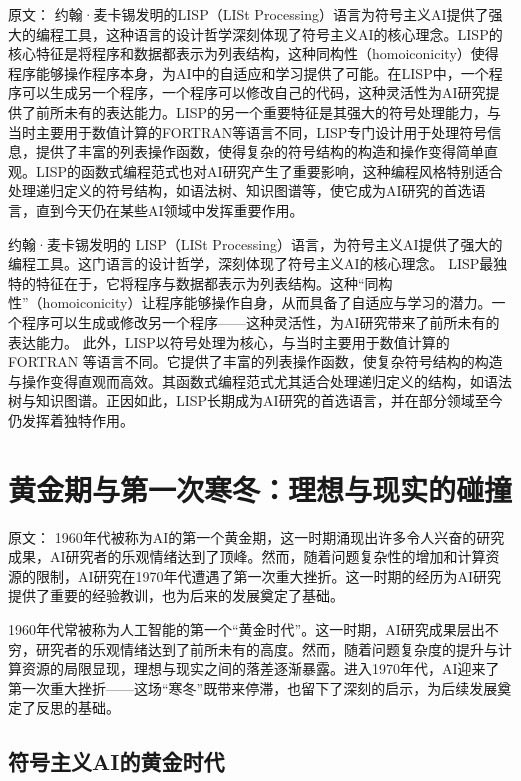 原文：
约翰·麦卡锡发明的LISP（LISt Processing）语言为符号主义AI提供了强大的编程工具，这种语言的设计哲学深刻体现了符号主义AI的核心理念。LISP的核心特征是将程序和数据都表示为列表结构，这种同构性（homoiconicity）使得程序能够操作程序本身，为AI中的自适应和学习提供了可能。在LISP中，一个程序可以生成另一个程序，一个程序可以修改自己的代码，这种灵活性为AI研究提供了前所未有的表达能力。LISP的另一个重要特征是其强大的符号处理能力，与当时主要用于数值计算的FORTRAN等语言不同，LISP专门设计用于处理符号信息，提供了丰富的列表操作函数，使得复杂的符号结构的构造和操作变得简单直观。LISP的函数式编程范式也对AI研究产生了重要影响，这种编程风格特别适合处理递归定义的符号结构，如语法树、知识图谱等，使它成为AI研究的首选语言，直到今天仍在某些AI领域中发挥重要作用。

约翰·麦卡锡发明的 LISP（LISt Processing）语言，为符号主义AI提供了强大的编程工具。这门语言的设计哲学，深刻体现了符号主义AI的核心理念。  
LISP最独特的特征在于，它将程序与数据都表示为列表结构。这种“同构性”（homoiconicity）让程序能够操作自身，从而具备了自适应与学习的潜力。一个程序可以生成或修改另一个程序——这种灵活性，为AI研究带来了前所未有的表达能力。  
此外，LISP以符号处理为核心，与当时主要用于数值计算的 FORTRAN 等语言不同。它提供了丰富的列表操作函数，使复杂符号结构的构造与操作变得直观而高效。其函数式编程范式尤其适合处理递归定义的结构，如语法树与知识图谱。正因如此，LISP长期成为AI研究的首选语言，并在部分领域至今仍发挥着独特作用。

\section{黄金期与第一次寒冬：理想与现实的碰撞}

原文：
1960年代被称为AI的第一个黄金期，这一时期涌现出许多令人兴奋的研究成果，AI研究者的乐观情绪达到了顶峰。然而，随着问题复杂性的增加和计算资源的限制，AI研究在1970年代遭遇了第一次重大挫折。这一时期的经历为AI研究提供了重要的经验教训，也为后来的发展奠定了基础。

1960年代常被称为人工智能的第一个“黄金时代”。这一时期，AI研究成果层出不穷，研究者的乐观情绪达到了前所未有的高度。然而，随着问题复杂度的提升与计算资源的局限显现，理想与现实之间的落差逐渐暴露。进入1970年代，AI迎来了第一次重大挫折——这场“寒冬”既带来停滞，也留下了深刻的启示，为后续发展奠定了反思的基础。

\subsection{符号主义AI的黄金时代}

